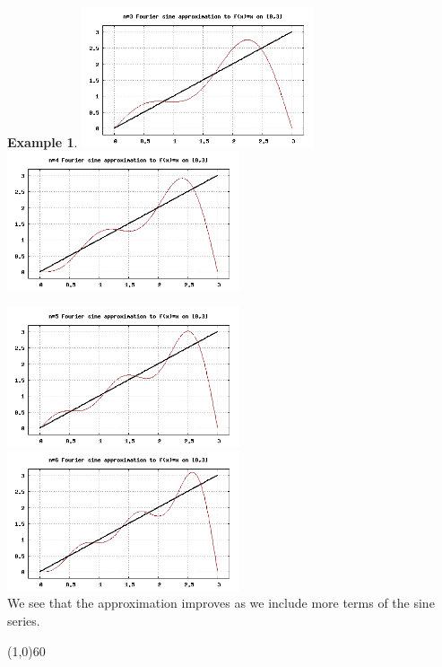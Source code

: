 \documentclass[10.5pt,twoside]{report}
\theoremstyle{definition}
\newtheorem{exmp}{Example}[section]
\begin{document}
\begin{exmp}
\includegraphics[width=2.7in]{example_6_5_2_3}
\includegraphics[width=2.7in]{example_6_5_2_4}

\includegraphics[width=2.7in]{example_6_5_2_5}
\includegraphics[width=2.7in]{example_6_5_2_6}
${}$\\

We see that the approximation improves as we include more terms of the sine series.

\end{exmp}

\line(1,0){60}
\linethickness{0.5mm}
\end{document}
